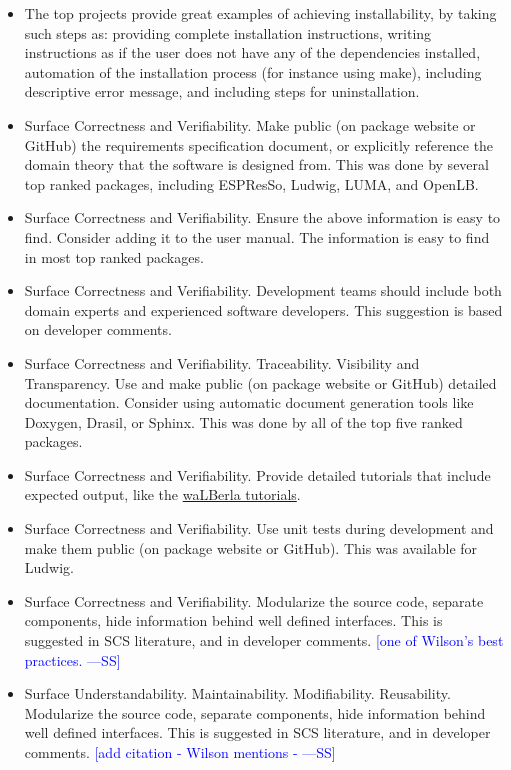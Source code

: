 \documentclass[final, 3p, times, authoryear]{elsarticle}
\newcommand{\authornote}[3]{\textcolor{#1}{[#3 ---#2]}}
\newcommand{\authornote}[3]{}
\newcommand{\wss}[1]{\authornote{blue}{SS}{#1}} %
\begin{document}
\begin{itemize}
	\item The top projects provide great examples of achieving installability,
	by taking such steps as: providing complete installation instructions,
	writing instructions as if the user does not have any of the dependencies
	installed, automation of the installation process (for instance using make),
	including descriptive error message, and including steps for uninstallation.
	\item Surface Correctness and Verifiability. Make public (on package website
	or GitHub) the requirements specification document, or explicitly reference
	the domain theory that the software is designed from.  This was done by
	several top ranked packages, including ESPResSo, Ludwig, LUMA, and OpenLB.
	\item Surface Correctness and Verifiability. Ensure the above information is
	easy to find. Consider adding it to the user manual. The information is easy
	to find in most top ranked packages.
	\item Surface Correctness and Verifiability. Development teams should
	include both domain experts and experienced software developers. This
	suggestion is based on developer comments.
	\item Surface Correctness and Verifiability. Traceability. Visibility and
	Transparency. Use and make public (on package website or GitHub) detailed
	documentation. Consider using automatic document generation tools like
	Doxygen, Drasil, or Sphinx. This was done by all of the top five ranked
	packages.
	\item Surface Correctness and Verifiability. Provide detailed tutorials that
	include expected output, like the
	\href{https://www.walberla.net/doxygen/index.html}{waLBerla tutorials}.
	\item Surface Correctness and Verifiability. Use unit tests during
	development and make them public (on package website or GitHub). This was
	available for Ludwig.
	\item Surface Correctness and Verifiability. Modularize the source code,
	separate components, hide information behind well defined interfaces. This
	is suggested in SCS literature, and in developer comments.  \wss{one of
	Wilson's best practices.}
	\item Surface Understandability. Maintainability.  Modifiability.
	Reusability. Modularize the source code, separate components, hide
	information behind well defined interfaces. This is suggested in SCS
	literature, and in developer comments. \wss{add citation - Wilson mentions -
}
\end{itemize}
\end{document}
